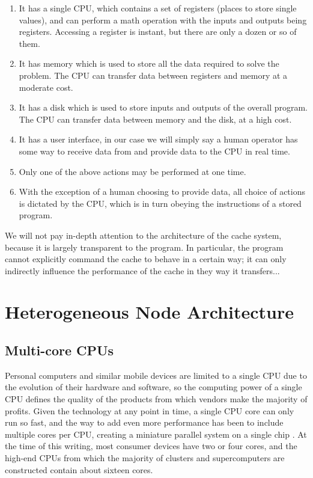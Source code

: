 \begin{enumerate}
\item It has a single CPU, which contains a set
of registers (places to store single values),
and can perform a math operation with the inputs
and outputs being registers.
Accessing a register is instant, but there are
only a dozen or so of them.
\item It has memory which is used to store
all the data required to solve the problem.
The CPU can transfer data between registers
and memory at a moderate cost.
\item It has a disk which is used to store
inputs and outputs of the overall program.
The CPU can transfer data between memory
and the disk, at a high cost.
\item It has a user interface, in our case
we will simply say a human operator has
some way to receive data from and provide
data to the CPU in real time.
\item Only one of the above actions may be
performed at one time.
\item With the exception of a human choosing
to provide data, all choice of actions is
dictated by the CPU, which is in turn obeying
the instructions of a stored program.
\end{enumerate}

We will not pay in-depth attention to the
architecture of the cache system, because it
is largely transparent to the program.
In particular, the program cannot explicitly
command the cache to behave in a certain way;
it can only indirectly influence the performance
of the cache in they way it transfers...

\section{Heterogeneous Node Architecture}

\subsection{Multi-core CPUs}

Personal computers and similar mobile devices are limited
to a single CPU due to the evolution of their hardware and
software, so the computing power of a single CPU defines
the quality of the products from which vendors make
the majority of profits.
Given the technology at any point in time, a single CPU
core can only run so fast, and the way to add even more performance
has been to include multiple cores per CPU,
creating a miniature parallel system on a single chip
\cite{hennessy2011computer}.
At the time of this writing, most consumer devices
have two or four cores, and the high-end CPUs from
which the majority of clusters and supercomputers are constructed
contain about sixteen cores.

